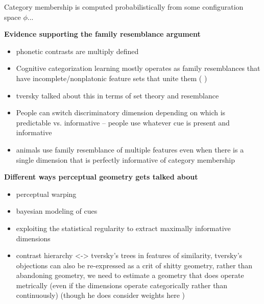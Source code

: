 \begin{multicols}{2}
Category membership is computed probabilistically from some configuration space $\phi$...








\textbf{Evidence supporting the family resemblance argument}
\begin{itemize}
	\item phonetic contrasts are multiply defined\cite{Lisker1977,Bailey1980}
	\item Cognitive categorization learning mostly operates as family resemblances that have incomplete/nonplatonic feature sets that unite them (\cite{roschFamilyResemblancesStudies1975}\cite{roschWittgensteinCategorizationResearch1987} \cite{couchmanRulesResemblanceTheir2010})
	\item tversky talked about this in terms of set theory and resemblance \cite{tverskyStudiesSimilarity1978} \cite{Tversky1970}
	\item People can switch discriminatory dimension depending on which is predictable vs. informative -- people use whatever cue is present and informative \cite{kiefteAbsorptionReliableSpectral2008}
	\item animals use family resemblance of multiple features even when there is a single dimension that is perfectly informative of category membership \cite{leaUseMultipleDimensions2008, couchmanRulesResemblanceTheir2010}

\end{itemize}

\textbf{Different ways perceptual geometry gets talked about}
\begin{itemize}
	\item perceptual warping
	\item bayesian modeling of cues
	\item exploiting the statistical regularity to extract maximally informative dimensions
	\item contrast hierarchy <-> tversky's trees in features of similarity, tversky's objections can also be re-expressed as a crit of shitty geometry, rather than abandoning geometry, we need to estimate a geometry that does operate metrically (even if the dimensions operate categorically rather than continuously) (though he does consider weights here \cite{ritovDifferentialWeightingCommon1990})
\end{itemize}


\end{multicols}
